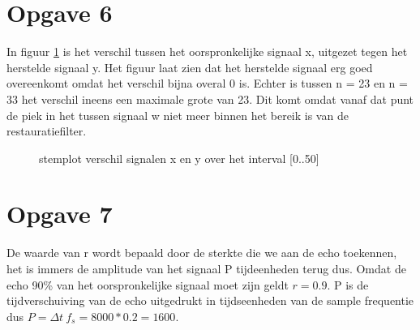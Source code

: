 \documentclass{article}
\begin{document}
\section{Opgave 6}
In figuur \ref{opgave6} is het verschil tussen het oorspronkelijke signaal x, uitgezet tegen het herstelde signaal y. Het figuur laat zien dat het herstelde signaal erg goed overeenkomt omdat het verschil bijna overal 0 is. Echter is tussen n = 23 en n = 33 het verschil ineens een maximale grote van 23. Dit komt omdat vanaf dat punt de piek in het tussen signaal w niet meer binnen het bereik is van de restauratiefilter.

\begin{figure}[h]
  \centering
  \caption{stemplot verschil signalen x en y over het interval [0..50]}
  \label{opgave6}
\end{figure}

\section{Opgave 7}
De waarde van r wordt bepaald door de sterkte die we aan de echo toekennen, het
is immers de amplitude van het signaal P tijdeenheden terug dus. Omdat de echo
90\% van het oorspronkelijke signaal moet zijn geldt $r = 0.9$. P is de
tijdverschuiving van de echo uitgedrukt in tijdseenheden van de sample
frequentie dus $P = \Delta t~f_s = 8000 * 0.2 = 1600$.
\end{document}
